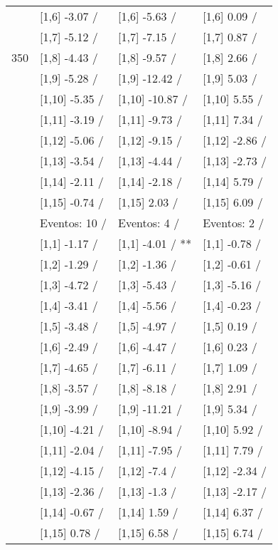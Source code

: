 \begin{table}
\begin{tabular}[t]{llll}
 & {}[1,6] -3.07  / & {}[1,6] -5.63  / & {}[1,6] 0.09  /\\
 & {}[1,7] -5.12  / & {}[1,7] -7.15  / & {}[1,7] 0.87  /\\
350 & {}[1,8] -4.43  / & {}[1,8] -9.57  / & {}[1,8] 2.66  /\\
\addlinespace
 & {}[1,9] -5.28  / & {}[1,9] -12.42  / & {}[1,9] 5.03  /\\
 & {}[1,10] -5.35  / & {}[1,10] -10.87  / & {}[1,10] 5.55  /\\
 & {}[1,11] -3.19  / & {}[1,11] -9.73  / & {}[1,11] 7.34  /\\
 & {}[1,12] -5.06  / & {}[1,12] -9.15  / & {}[1,12] -2.86  /\\
 & {}[1,13] -3.54  / & {}[1,13] -4.44  / & {}[1,13] -2.73  /\\
\addlinespace
 & {}[1,14] -2.11  / & {}[1,14] -2.18  / & {}[1,14] 5.79  /\\
 & {}[1,15] -0.74  / & {}[1,15] 2.03  / & {}[1,15] 6.09  /\\
 & Eventos:  10 / & Eventos:  4 / & Eventos:  2 /\\
 & {}[1,1] -1.17  / & {}[1,1] -4.01  / ** & {}[1,1] -0.78  /\\
 & {}[1,2] -1.29  / & {}[1,2] -1.36  / & {}[1,2] -0.61  /\\
\addlinespace
 & {}[1,3] -4.72  / & {}[1,3] -5.43  / & {}[1,3] -5.16  /\\
 & {}[1,4] -3.41  / & {}[1,4] -5.56  / & {}[1,4] -0.23  /\\
 & {}[1,5] -3.48  / & {}[1,5] -4.97  / & {}[1,5] 0.19  /\\
 & {}[1,6] -2.49  / & {}[1,6] -4.47  / & {}[1,6] 0.23  /\\
 & {}[1,7] -4.65  / & {}[1,7] -6.11  / & {}[1,7] 1.09  /\\
\addlinespace
500 & {}[1,8] -3.57  / & {}[1,8] -8.18  / & {}[1,8] 2.91  /\\
 & {}[1,9] -3.99  / & {}[1,9] -11.21  / & {}[1,9] 5.34  /\\
 & {}[1,10] -4.21  / & {}[1,10] -8.94  / & {}[1,10] 5.92  /\\
 & {}[1,11] -2.04  / & {}[1,11] -7.95  / & {}[1,11] 7.79  /\\
 & {}[1,12] -4.15  / & {}[1,12] -7.4  / & {}[1,12] -2.34  /\\
\addlinespace
 & {}[1,13] -2.36  / & {}[1,13] -1.3  / & {}[1,13] -2.17  /\\
 & {}[1,14] -0.67  / & {}[1,14] 1.59  / & {}[1,14] 6.37  /\\
 & {}[1,15] 0.78  / & {}[1,15] 6.58  / & {}[1,15] 6.74  /\\
\bottomrule
\end{tabular}
\end{table}
